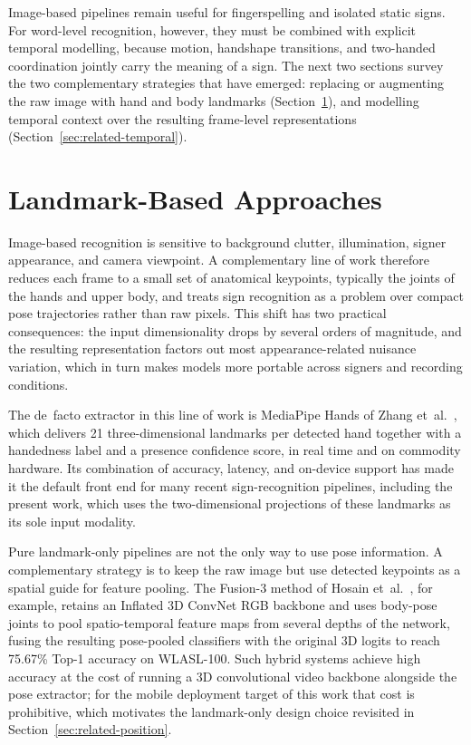 Image-based pipelines remain useful for fingerspelling and isolated
static signs. For word-level recognition, however, they must be
combined with explicit temporal modelling, because motion, handshape
transitions, and two-handed coordination jointly carry the meaning of
a sign. The next two
sections survey the two complementary strategies that have emerged:
replacing or augmenting the raw image with hand and body landmarks
(Section~\ref{sec:related-landmark}), and modelling temporal context
over the resulting frame-level representations
(Section~\ref{sec:related-temporal}).

\section{Landmark-Based Approaches}
\label{sec:related-landmark}

Image-based recognition is sensitive to background clutter,
illumination, signer appearance, and camera viewpoint. A complementary
line of work therefore reduces each frame to a small set of anatomical
keypoints, typically the joints of the hands and upper body, and
treats sign recognition as a problem over compact pose trajectories
rather than raw pixels. This shift has two practical consequences: the
input dimensionality drops by several orders of magnitude, and the
resulting representation factors out most appearance-related nuisance
variation, which in turn makes models more portable across signers and
recording conditions.

The de~facto extractor in this line of work is MediaPipe Hands of
Zhang et~al.~\cite{zhang2020mediapipe}, which delivers 21
three-dimensional landmarks per detected hand together with a
handedness label and a presence confidence score, in real time and on
commodity hardware. Its combination of accuracy, latency, and
on-device support has made it the default front end for many recent
sign-recognition pipelines, including the present work, which uses the
two-dimensional projections of these landmarks as its sole input
modality.

Pure landmark-only pipelines are not the only way to use pose
information. A complementary strategy is to keep the raw image but
use detected keypoints as a spatial guide for feature pooling. The
Fusion-3 method of Hosain et~al.~\cite{hosain2021fusion}, for example,
retains an Inflated 3D ConvNet RGB backbone and uses body-pose joints
to pool spatio-temporal feature maps from several depths of the
network, fusing the resulting pose-pooled classifiers with the
original 3D logits to reach 75.67\% Top-1 accuracy on WLASL-100. Such
hybrid systems achieve high accuracy at the cost of running a 3D
convolutional video backbone alongside the pose extractor; for the
mobile deployment target of this work that cost is prohibitive, which
motivates the landmark-only design choice revisited in
Section~\ref{sec:related-position}.


